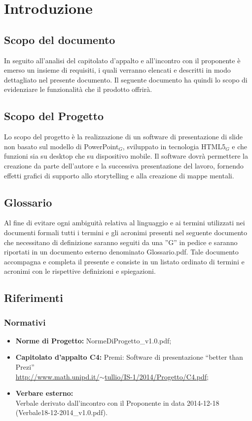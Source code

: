 \section{Introduzione}

\subsection{Scopo del documento}
In seguito all'analisi del capitolato d'appalto e all'incontro con il proponente è emerso un insieme di requisiti, i quali verranno elencati e descritti in modo dettagliato nel presente documento.
Il seguente documento ha quindi lo scopo di evidenziare le funzionalità che il prodotto offrirà.

\subsection{Scopo del Progetto}
Lo scopo del progetto è la realizzazione di un software di presentazione di slide non basato sul modello di PowerPoint$_{G}$, sviluppato in tecnologia HTML5$_{G}$ e che funzioni sia su desktop che su dispositivo mobile. Il software dovrà permettere la creazione da parte dell'autore e la successiva presentazione del lavoro, fornendo effetti grafici di supporto allo storytelling e alla creazione di mappe mentali. 

\subsection{Glossario}
Al fine di evitare ogni ambiguità relativa al linguaggio e ai termini utilizzati nei documenti formali tutti i termini e gli acronimi presenti nel seguente documento che necessitano di definizione saranno seguiti da una ”G” in pedice e saranno riportati in un documento esterno denominato Glossario.pdf. Tale documento accompagna e completa il presente e consiste in un listato ordinato di termini e acronimi con le rispettive definizioni e spiegazioni.

\subsection{Riferimenti}
\subsubsection{Normativi}
\begin{itemize}
	\item \textbf{Norme di Progetto:} NormeDiProgetto\_v1.0.pdf;
	\item \textbf{Capitolato d’appalto C4:} Premi: Software di presentazione ``better than Prezi''\\ \href{http://www.math.unipd.it/~tullio/IS-1/2014/Progetto/C4.pdf}{http://www.math.unipd.it/$\sim$tullio/IS-1/2014/Progetto/C4.pdf};
	\item \textbf{Verbare esterno:} \\ 
		Verbale derivato dall'incontro con il Proponente in data 2014-12-18 (Verbale18-12-2014\_v1.0.pdf).
\end{itemize}

